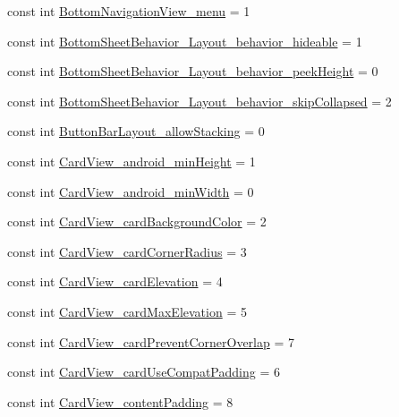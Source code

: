 \begin{CompactItemize}
\item 
const int \hyperlink{class__2doo_1_1_droid_1_1_resource_1_1_styleable_ec3a9cdf7b32c787467b3044d1bf770f}{BottomNavigationView\_\-menu} = 1
\item 
const int \hyperlink{class__2doo_1_1_droid_1_1_resource_1_1_styleable_680b7a63e0ffc7399fad838f19ed6334}{BottomSheetBehavior\_\-Layout\_\-behavior\_\-hideable} = 1
\item 
const int \hyperlink{class__2doo_1_1_droid_1_1_resource_1_1_styleable_5404d5e0c646c7004f9e2d0a71c40c9b}{BottomSheetBehavior\_\-Layout\_\-behavior\_\-peekHeight} = 0
\item 
const int \hyperlink{class__2doo_1_1_droid_1_1_resource_1_1_styleable_5594797e6645a90018387e1f26a29b55}{BottomSheetBehavior\_\-Layout\_\-behavior\_\-skipCollapsed} = 2
\item 
const int \hyperlink{class__2doo_1_1_droid_1_1_resource_1_1_styleable_b77293ef4ee449ecc85329c8072699fa}{ButtonBarLayout\_\-allowStacking} = 0
\item 
const int \hyperlink{class__2doo_1_1_droid_1_1_resource_1_1_styleable_06c42120bb9cad99ae45e7adaee490e4}{CardView\_\-android\_\-minHeight} = 1
\item 
const int \hyperlink{class__2doo_1_1_droid_1_1_resource_1_1_styleable_96a18b33027d9bd55b6daa24ce662331}{CardView\_\-android\_\-minWidth} = 0
\item 
const int \hyperlink{class__2doo_1_1_droid_1_1_resource_1_1_styleable_46283e2cd078c62c8bdf0fffb5fcc312}{CardView\_\-cardBackgroundColor} = 2
\item 
const int \hyperlink{class__2doo_1_1_droid_1_1_resource_1_1_styleable_2bb3a3a1edfbdf216a42796b3b9c260b}{CardView\_\-cardCornerRadius} = 3
\item 
const int \hyperlink{class__2doo_1_1_droid_1_1_resource_1_1_styleable_be454e30376acc01552d38f1f3ba68ec}{CardView\_\-cardElevation} = 4
\item 
const int \hyperlink{class__2doo_1_1_droid_1_1_resource_1_1_styleable_2b85507d81813f1747cd22951f1e810f}{CardView\_\-cardMaxElevation} = 5
\item 
const int \hyperlink{class__2doo_1_1_droid_1_1_resource_1_1_styleable_22f5e3e6f6f8b8b96e6d07018e06cb5a}{CardView\_\-cardPreventCornerOverlap} = 7
\item 
const int \hyperlink{class__2doo_1_1_droid_1_1_resource_1_1_styleable_eabf6ade7f0c3886d145426f18f6131b}{CardView\_\-cardUseCompatPadding} = 6
\item 
const int \hyperlink{class__2doo_1_1_droid_1_1_resource_1_1_styleable_9bd3c86a393992af13090f140f991704}{CardView\_\-contentPadding} = 8

\end{CompactItemize}
